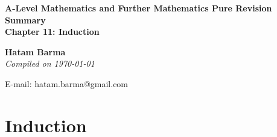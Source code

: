 \documentclass[11pt, a4paper]{article}
\begin{document}
\begin{titlepage}
   \begin{center}
       \vspace*{2.5cm}
	\huge
       \textbf{A-Level Mathematics and Further Mathematics Pure Revision Summary} \\
	\vspace{1cm}
	\Large
       \textbf{Chapter 11: Induction}
            
       \vspace{1.5cm}
	\LARGE
       \textbf{Hatam Barma} \\
	\vspace{0.75cm}
       \normalsize
       \emph{Compiled on \Datea\today} \\

       \vfill
        

	E-mail: hatam.barma@gmail.com
   \end{center}
\end{titlepage}


\tableofcontents

\clearpage
\section{Induction}
\vspace{0.5cm}
\end{document}
